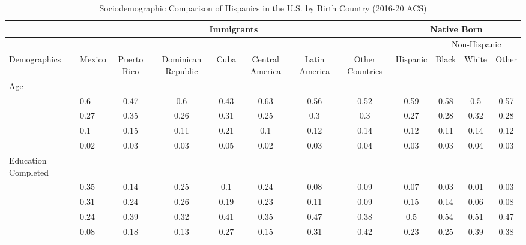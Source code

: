 \documentclass[
]{article}
\begin{document}
\begin{landscape}
\begin{table}[ht]
\centering
\begin{threeparttable}
\caption{Sociodemographic Comparison of Hispanics in the U.S. by Birth Country (2016-20 ACS)} 
\begingroup\small
\begin{tabular}{>{\raggedright\arraybackslash}p{3.2cm}|lcccccc|cccc}
& \multicolumn{7}{c|}{Immigrants} & \multicolumn{4}{c}{Native Born} \\
\cline{2-12}
& \multicolumn{7}{c|}{} & \multicolumn{1}{c}{} & \multicolumn{3}{c}{Non-Hispanic} \\
  \hline
Demographics & Mexico & Puerto Rico & Dominican Republic & Cuba & Central America & Latin America & Other Countries & Hispanic & Black & White & Other \\ 
  \hline
Age &  &  &  &  &  &  &  &  &  &  &  \\ 
  \multicolumn{1}{>{\raggedleft\arraybackslash}p{1.5cm}|}{\makebox[1.5cm][r]{60 - 69 }}& 0.6 & 0.47 & 0.6 & 0.43 & 0.63 & 0.56 & 0.52 & 0.59 & 0.58 & 0.5 & 0.57 \\ 
  \multicolumn{1}{>{\raggedleft\arraybackslash}p{1.5cm}|}{\makebox[1.5cm][r]{70 - 79 }}& 0.27 & 0.35 & 0.26 & 0.31 & 0.25 & 0.3 & 0.3 & 0.27 & 0.28 & 0.32 & 0.28 \\ 
  \multicolumn{1}{>{\raggedleft\arraybackslash}p{1.5cm}|}{\makebox[1.5cm][r]{80 - 89 }}& 0.1 & 0.15 & 0.11 & 0.21 & 0.1 & 0.12 & 0.14 & 0.12 & 0.11 & 0.14 & 0.12 \\ 
  \multicolumn{1}{>{\raggedleft\arraybackslash}p{1.5cm}|}{\makebox[1.5cm][r]{90 plus }}& 0.02 & 0.03 & 0.03 & 0.05 & 0.02 & 0.03 & 0.04 & 0.03 & 0.03 & 0.04 & 0.03 \\ 
  Education Completed &  &  &  &  &  &  &  &  &  &  &  \\ 
  \multicolumn{1}{>{\raggedleft\arraybackslash}p{3.2cm}|}{\makebox[3.2cm][r]{Less than Primary }}& 0.35 & 0.14 & 0.25 & 0.1 & 0.24 & 0.08 & 0.09 & 0.07 & 0.03 & 0.01 & 0.03 \\ 
  \multicolumn{1}{>{\raggedleft\arraybackslash}p{1.7cm}|}{\makebox[1.7cm][r]{Primary }}& 0.31 & 0.24 & 0.26 & 0.19 & 0.23 & 0.11 & 0.09 & 0.15 & 0.14 & 0.06 & 0.08 \\ 
  \multicolumn{1}{>{\raggedleft\arraybackslash}p{2cm}|}{\makebox[2cm][r]{Secondary }}& 0.24 & 0.39 & 0.32 & 0.41 & 0.35 & 0.47 & 0.38 & 0.5 & 0.54 & 0.51 & 0.47 \\ 
  \multicolumn{1}{>{\raggedleft\arraybackslash}p{2cm}|}{\makebox[2cm][r]{University }}& 0.08 & 0.18 & 0.13 & 0.27 & 0.15 & 0.31 & 0.42 & 0.23 & 0.25 & 0.39 & 0.38 \\ 

\end{tabular}
\end{threeparttable}
\end{table}
\end{landscape}
\end{document}
